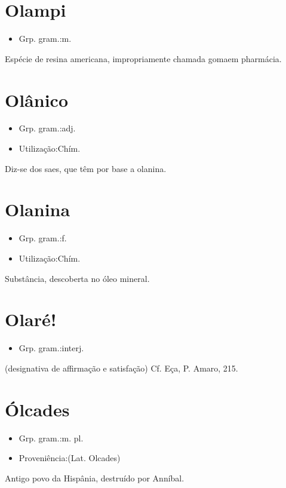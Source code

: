 \section{Olampi}
\begin{itemize}
\item {Grp. gram.:m.}
\end{itemize}
Espécie de resina americana, impropriamente chamada \textunderscore goma\textunderscore  em pharmácia.
\section{Olânico}
\begin{itemize}
\item {Grp. gram.:adj.}
\end{itemize}
\begin{itemize}
\item {Utilização:Chím.}
\end{itemize}
Diz-se dos saes, que têm por base a olanina.
\section{Olanina}
\begin{itemize}
\item {Grp. gram.:f.}
\end{itemize}
\begin{itemize}
\item {Utilização:Chím.}
\end{itemize}
Substância, descoberta no óleo mineral.
\section{Olaré!}
\begin{itemize}
\item {Grp. gram.:interj.}
\end{itemize}
(designativa de affirmação e satisfação) Cf. Eça, \textunderscore P. Amaro\textunderscore , 215.
\section{Ólcades}
\begin{itemize}
\item {Grp. gram.:m. pl.}
\end{itemize}
\begin{itemize}
\item {Proveniência:(Lat. \textunderscore Olcades\textunderscore )}
\end{itemize}
Antigo povo da Hispânia, destruído por Anníbal.

